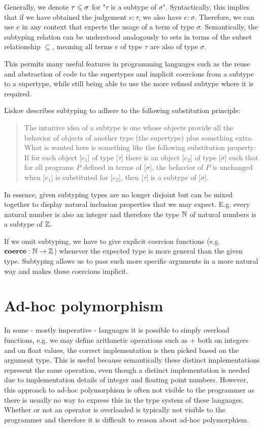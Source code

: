 Generally, we denote $\tau \leqslant \sigma$ for "$\tau$ is a subtype of $\sigma$".
Syntactically, this implies that if we have obtained the judgement $e : \tau$, we also have $e : \sigma$.
Therefore, we can use $e$ in any context that expects the usage of a term of type $\sigma$.
Semantically, the subtyping relation can be understood analogously to sets in terms of the subset relationship $\subseteq$,
meaning all terms $e$ of type $\tau$ are also of type $\sigma$.
\cite{reynolds_1998}

This permits many useful features in programming languages such as the reuse and abstraction of code to the supertypes and implicit coercions from a subtype to a supertype, while still being able to use the more refined subtype where it is required.

Liskov \cite{liskov} describes subtyping to adhere to the following substitution principle:

\begin{quote}
  The intuitive idea of a subtype is one whose objects provide all the behavior of objects of another type (the supertype) plus something extra.
  What is wanted here is something like the following substitution property:
  If for each object [$e_1$] of type [$\tau$] there is an object [$e_2$] of type [$\sigma$] such that for all programs $P$ defined in terms of [$\sigma$],
  the behavior of $P$ is unchanged when [$e_1$] is substituted for [$e_2$], then [$\tau$] is a subtype of [$\sigma$].
\end{quote}

In essence, given subtyping types are no longer disjoint but can be mixed together to display natural inclusion properties that we may expect.
E.g. every natural number is also an integer and therefore the type $\mathbb{N}$ of natural numbers is a subtype of $\mathbb{Z}$.

If we omit subtyping, we have to give explicit coercion functions (e.g. $\mathbf{coerce} : \mathbb{N} \to \mathbb{Z}$) whenever the expected type is more general than the given type.
Subtyping allows us to pass such more specific arguments in a more natural way and makes these coercions implicit.

\section{Ad-hoc polymorphism}
\label{sec:ad-hoc-polymorphism}

In some - mostly imperative - languages it is possible to simply overload functions, e.g. we may define arithmetic operations such as $+$ both on integers and on float values, the correct implementation is then picked based on the argument type.
This is useful because semantically these distinct implementations represent the same operation, even though a distinct implementation is needed due to implementation details of integer and floating point numbers.
However, this approach to ad-hoc polymorphism is often not visible to the programmer as there is usually no way to express this in the type system of these languages.
Whether or not an operator is overloaded is typically not visible to the programmer and therefore it is difficult to reason about ad-hoc polymorphism. %

